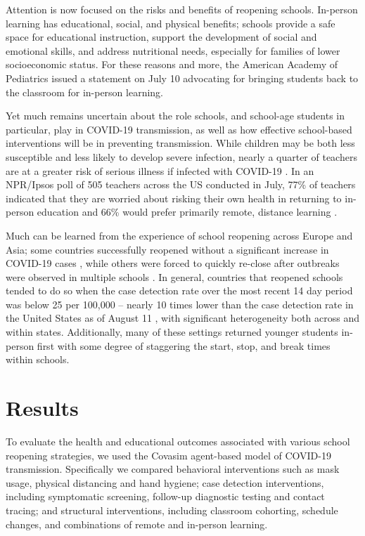 \documentclass[9pt,twocolumn,twoside,lineno]{pnas-new}
\begin{document}
Attention is now focused on the risks and benefits of reopening schools. In-person learning has educational, social, and physical benefits; schools provide a safe space for educational instruction, support the development of social and emotional skills, and address nutritional needs, especially for families of lower socioeconomic status. For these reasons and more, the American Academy of Pediatrics issued a statement \cite{AAPstatement} on July 10 advocating for bringing students back to the classroom for in-person learning. 

Yet much remains uncertain about the role schools, and school-age students in particular, play in COVID-19 transmission, as well as how effective school-based interventions will be in preventing transmission. While children may be both less susceptible and less likely to develop severe infection, nearly a quarter of teachers are at a greater risk of serious illness if infected with COVID-19 \cite{claxton_how_2020}. In an NPR/Ipsos poll of 505 teachers across the US conducted in July, 77\% of teachers indicated that they are worried about risking their own health in returning to in-person education and 66\% would prefer primarily remote, distance learning \cite{kamenetz_most_2020}.

Much can be learned from the experience of school reopening across Europe and Asia; some countries successfully reopened without a significant increase in COVID-19 cases \cite{heavey2020no}, while others were forced to quickly re-close after outbreaks were observed in multiple schools \cite{couzin-frankel_school_2020, vegas_reopening_2020}. In general, countries that reopened schools tended to do so when the case detection rate over the most recent 14 day period was below 25 per 100,000 -- nearly 10 times lower than the case detection rate in the United States as of August 11 \cite{michaud2020}, with significant heterogeneity both across and within states. Additionally, many of these settings returned younger students in-person first with some degree of staggering the start, stop, and break times within schools.

\section*{Results}
To evaluate the health and educational outcomes associated with various school reopening strategies, we used the Covasim agent-based model of COVID-19 transmission. Specifically we compared behavioral interventions such as mask usage, physical distancing and hand hygiene; case detection interventions, including symptomatic screening, follow-up diagnostic testing and contact tracing; and structural interventions, including classroom cohorting, schedule changes, and combinations of remote and in-person learning.
\end{document}
